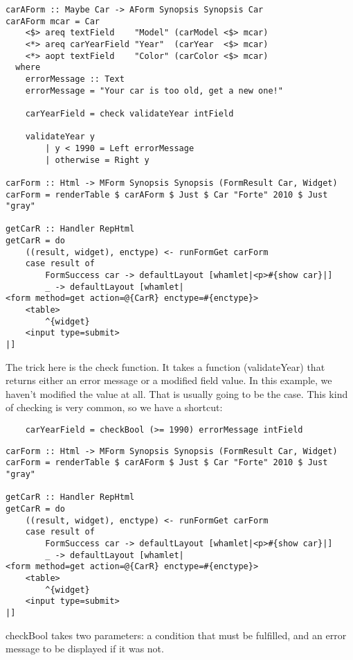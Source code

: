 \begin{lstlisting}
carAForm :: Maybe Car -> AForm Synopsis Synopsis Car
carAForm mcar = Car
    <$> areq textField    "Model" (carModel <$> mcar)
    <*> areq carYearField "Year"  (carYear  <$> mcar)
    <*> aopt textField    "Color" (carColor <$> mcar)
  where
    errorMessage :: Text
    errorMessage = "Your car is too old, get a new one!"

    carYearField = check validateYear intField

    validateYear y
        | y < 1990 = Left errorMessage
        | otherwise = Right y

carForm :: Html -> MForm Synopsis Synopsis (FormResult Car, Widget)
carForm = renderTable $ carAForm $ Just $ Car "Forte" 2010 $ Just "gray"

getCarR :: Handler RepHtml
getCarR = do
    ((result, widget), enctype) <- runFormGet carForm
    case result of
        FormSuccess car -> defaultLayout [whamlet|<p>#{show car}|]
        _ -> defaultLayout [whamlet|
<form method=get action=@{CarR} enctype=#{enctype}>
    <table>
        ^{widget}
    <input type=submit>
|]
\end{lstlisting}

The trick here is the check function. It takes a function (validateYear) that returns
either an error message or a modified field value. In this example, we haven't modified
the value at all. That is usually going to be the case. This kind of checking is very
common, so we have a shortcut:

\begin{lstlisting}
    carYearField = checkBool (>= 1990) errorMessage intField
\end{lstlisting}

\begin{lstlisting}
carForm :: Html -> MForm Synopsis Synopsis (FormResult Car, Widget)
carForm = renderTable $ carAForm $ Just $ Car "Forte" 2010 $ Just "gray"

getCarR :: Handler RepHtml
getCarR = do
    ((result, widget), enctype) <- runFormGet carForm
    case result of
        FormSuccess car -> defaultLayout [whamlet|<p>#{show car}|]
        _ -> defaultLayout [whamlet|
<form method=get action=@{CarR} enctype=#{enctype}>
    <table>
        ^{widget}
    <input type=submit>
|]
\end{lstlisting}

checkBool takes two parameters: a condition that must be fulfilled, and an error message
to be displayed if it was not.


